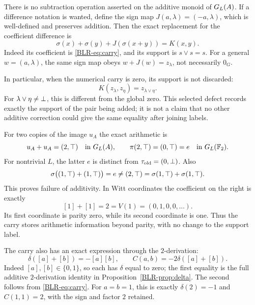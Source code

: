 There is no subtraction operation asserted on the additive monoid of
$G_L(A)$. If a difference notation is wanted, define the sign map
$J(a,\lambda)=(-a,\lambda)$, which is well-defined and preserves
addition. Then the exact replacement for the coefficient difference is
\begin{equation}\label{BLR-eq:sign-defect}
 \sigma(x)+\sigma(y)+J(\sigma(x+y))=K(x,y).
\end{equation}
Indeed its coefficient is \eqref{BLR-eq:carry}, and its support is
$s\vee s=s$. For a general $w=(a,\lambda)$, the same sign map obeys
$w+J(w)=z_\lambda$, not necessarily $0_G$.

In particular, when the numerical carry is zero, its support is not
discarded:
\[
 K(z_\lambda,z_\eta)=z_{\lambda\vee\eta}.
\]
For $\lambda\vee\eta\ne\bot$, this is different from the global zero.
This selected defect records exactly the support of the pair being
added; it is not a claim that no other additive correction could give
the same equality after joining labels.

For two copies of the image $u_A$ the exact arithmetic is
\begin{equation}\label{BLR-eq:presence-double}
 u_A+u_A=(2,\top)
 \quad\hbox{in }G_L(A),\qquad
 \pi(2,\top)=(0,\top)=e
 \quad\hbox{in }G_L(\mathbb F_2).
\end{equation}
For nontrivial $L$, the latter $e$ is distinct from
$\tau_{\mathrm{old}}=(0,\bot)$. Also
\[
 \sigma\bigl((1,\top)+(1,\top)\bigr)=e
 \ne(2,\top)=\sigma(1,\top)+\sigma(1,\top).
\]
This proves failure of additivity. In Witt coordinates the coefficient
on the right is exactly
\[
 [1]+[1]=2=V(1)=(0,1,0,0,\ldots).
\]
Its first coordinate is parity zero, while its second coordinate is one.
Thus the carry stores arithmetic information beyond parity, with no
change to the support label.

The carry also has an exact expression through the $2$-derivation:
\begin{equation}\label{BLR-eq:carry-delta}
 \delta([a]+[b])=-[a][b],\qquad
 C(a,b)=-2\delta([a]+[b]).
\end{equation}
Indeed $[a],[b]\in\{0,1\}$, so each has $\delta$ equal to zero;
the first equality is the full additive $2$-derivation identity in
Proposition~\ref{BLR-prop:delta}. The second follows from
\eqref{BLR-eq:carry}. For $a=b=1$, this is exactly $\delta(2)=-1$ and
$C(1,1)=2$, with the sign and factor $2$ retained.

